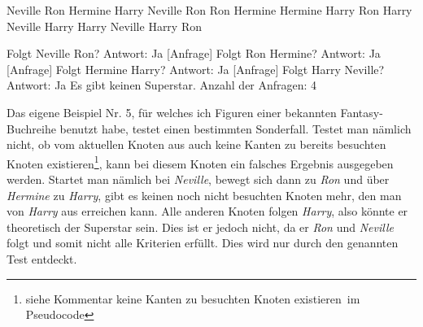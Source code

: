 \documentclass[a4paper, notitlepage, 12pt]{scrartcl}
\begin{document}

\begin{MyVerbatim}
Neville Ron Hermine Harry
Neville Ron
Ron Hermine
Hermine Harry
Ron Harry
Neville Harry
Harry Neville
Harry Ron
\end{MyVerbatim}


   \begin{MyVerbatim}
 [Anfrage] Folgt Neville Ron? Antwort: Ja
 [Anfrage] Folgt Ron Hermine? Antwort: Ja
 [Anfrage] Folgt Hermine Harry? Antwort: Ja
 [Anfrage] Folgt Harry Neville? Antwort: Ja
 Es gibt keinen Superstar.
 Anzahl der Anfragen: 4
   \end{MyVerbatim}

Das eigene Beispiel Nr. 5, für welches ich Figuren einer bekannten Fantasy-Buchreihe benutzt habe, testet einen bestimmten Sonderfall. Testet man nämlich nicht, ob vom aktuellen Knoten aus auch keine Kanten zu bereits besuchten Knoten existieren\footnote{siehe Kommentar \glqq keine Kanten zu besuchten Knoten existieren\grqq ~im Pseudocode}, kann bei diesem Knoten ein falsches Ergebnis ausgegeben werden. Startet man nämlich bei \textit{Neville}, bewegt sich dann zu \textit{Ron} und über \textit{Hermine} zu \textit{Harry}, gibt es keinen noch nicht besuchten Knoten mehr, den man von \textit{Harry} aus erreichen kann. Alle anderen Knoten folgen \textit{Harry}, also könnte er theoretisch der Superstar sein. Dies ist er jedoch nicht, da er \textit{Ron} und \textit{Neville} folgt und somit nicht alle Kriterien erfüllt. Dies wird nur durch den genannten Test entdeckt.
\end{document}
